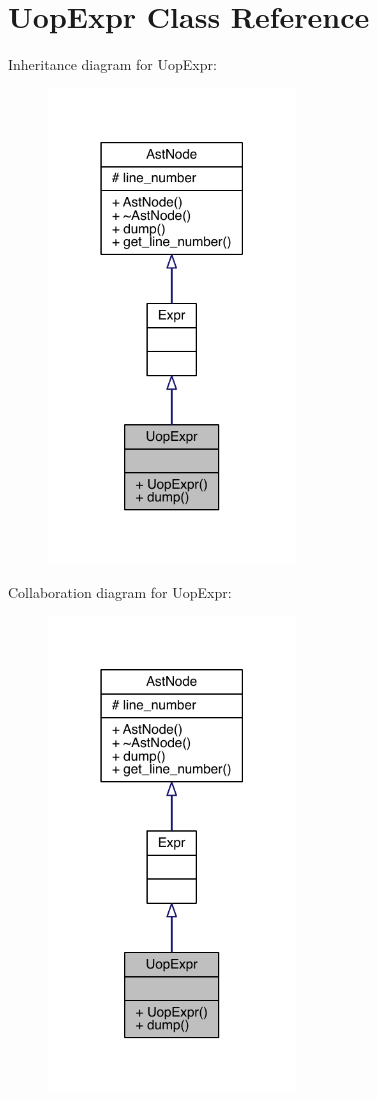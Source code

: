 \hypertarget{class_uop_expr}{}\section{Uop\+Expr Class Reference}
\label{class_uop_expr}


Inheritance diagram for Uop\+Expr\+:\nopagebreak
\begin{figure}[H]
\begin{center}
\leavevmode
\includegraphics[width=186pt]{class_uop_expr__inherit__graph}
\end{center}
\end{figure}


Collaboration diagram for Uop\+Expr\+:\nopagebreak
\begin{figure}[H]
\begin{center}
\leavevmode
\includegraphics[width=186pt]{class_uop_expr__coll__graph}
\end{center}
\end{figure}
